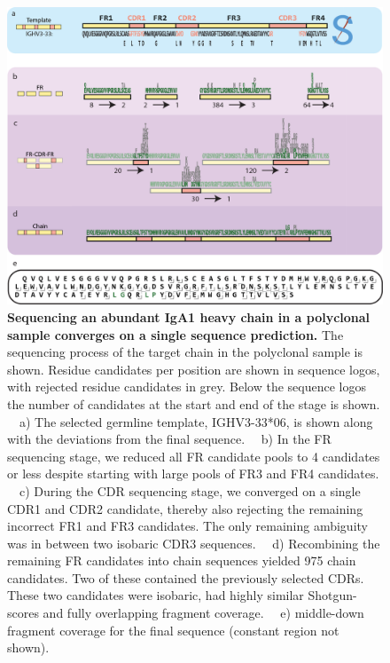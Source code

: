 \begin{figure}[!htb]
  \center
  \includegraphics[]{Chapter.5/Figures/f4.png}
  \caption{\textbf{Sequencing an abundant IgA1 heavy chain in a polyclonal sample converges on a single sequence prediction.} The sequencing process of the target chain in the polyclonal sample is shown. Residue candidates per position are shown in sequence logos, with rejected residue candidates in grey. Below the sequence logos the number of candidates at the start and end of the stage is shown. ~~a) The selected germline template, IGHV3-33*06, is shown along with the deviations from the final sequence. ~~b) In the FR sequencing stage, we reduced all FR candidate pools to 4 candidates or less despite starting with large pools of FR3 and FR4 candidates. ~~c) During the CDR sequencing stage, we converged on a single CDR1 and CDR2 candidate, thereby also rejecting the remaining incorrect FR1 and FR3 candidates. The only remaining ambiguity was in between two isobaric CDR3 sequences. ~~d) Recombining the remaining FR candidates into chain sequences yielded 975 chain candidates. Two of these contained the previously selected CDRs. These two candidates were isobaric, had highly similar Shotgun-scores and fully overlapping fragment coverage. ~~e) middle-down fragment coverage for the final sequence (constant region not shown).}
  \label{fig:fig5.4}
\end{figure}

